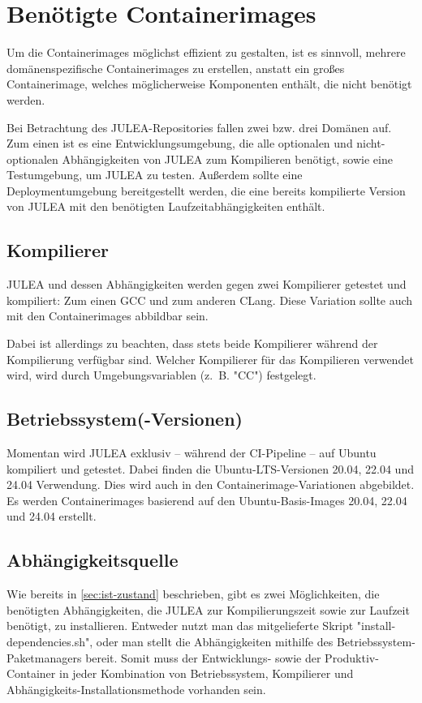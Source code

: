 \section{Benötigte Containerimages}

Um die Containerimages möglichst effizient zu gestalten, ist es sinnvoll, mehrere domänenspezifische Containerimages zu erstellen, anstatt ein großes Containerimage, welches möglicherweise Komponenten enthält, die nicht benötigt werden.

Bei Betrachtung des JULEA-Repositories fallen zwei bzw. drei Domänen auf. Zum einen ist es eine Entwicklungsumgebung, die alle optionalen und nicht-optionalen Abhängigkeiten von JULEA zum Kompilieren benötigt, sowie eine Testumgebung, um JULEA zu testen. Außerdem sollte eine Deploymentumgebung bereitgestellt werden, die eine bereits kompilierte Version von JULEA mit den benötigten Laufzeitabhängigkeiten enthält.

\subsection{Kompilierer}

JULEA und dessen Abhängigkeiten werden gegen zwei Kompilierer getestet und kompiliert: Zum einen GCC und zum anderen CLang.
Diese Variation sollte auch mit den Containerimages abbildbar sein. 

Dabei ist allerdings zu beachten, dass stets beide Kompilierer während der Kompilierung verfügbar sind. Welcher Kompilierer für das Kompilieren verwendet wird, wird durch Umgebungsvariablen (z. B. "CC") festgelegt.  

\subsection{Betriebssystem(-Versionen)}

Momentan wird JULEA exklusiv – während der CI-Pipeline – auf Ubuntu kompiliert und getestet. Dabei finden die Ubuntu-LTS-Versionen 20.04, 22.04 und 24.04 Verwendung. Dies wird auch in den Containerimage-Variationen abgebildet. Es werden Containerimages basierend auf den Ubuntu-Basis-Images 20.04, 22.04 und 24.04 erstellt.

\subsection{Abhängigkeitsquelle}

Wie bereits in \cref{sec:ist-zustand} beschrieben, gibt es zwei Möglichkeiten, die benötigten Abhängigkeiten, die JULEA zur Kompilierungszeit sowie zur Laufzeit benötigt, zu installieren. Entweder nutzt man das mitgelieferte Skript "install-dependencies.sh", oder man stellt die Abhängigkeiten mithilfe des Betriebssystem-Paketmanagers bereit. Somit muss der Entwicklungs- sowie der Produktiv-Container in jeder Kombination von Betriebssystem, Kompilierer und Abhängigkeits-Installationsmethode vorhanden sein.

